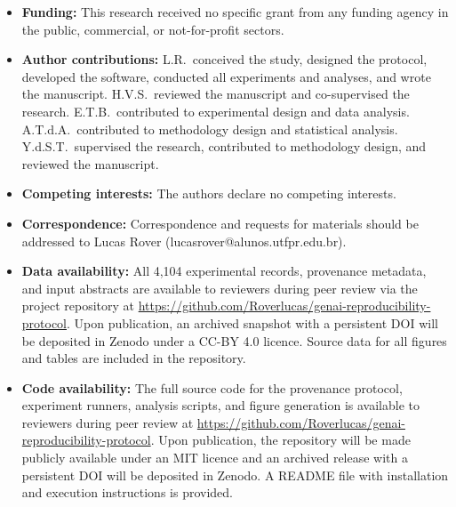 \documentclass[sn-nature]{sn-jnl}
\begin{document}
\begin{itemize}
\item \textbf{Funding:}
This research received no specific grant from any funding agency in the public, commercial, or not-for-profit sectors.

\item \textbf{Author contributions:}
L.R.\ conceived the study, designed the protocol, developed the software, conducted all experiments and analyses, and wrote the manuscript.
H.V.S.\ reviewed the manuscript and co-supervised the research.
E.T.B.\ contributed to experimental design and data analysis.
A.T.d.A.\ contributed to methodology design and statistical analysis.
Y.d.S.T.\ supervised the research, contributed to methodology design, and reviewed the manuscript.

\item \textbf{Competing interests:}
The authors declare no competing interests.

\item \textbf{Correspondence:}
Correspondence and requests for materials should be addressed to Lucas Rover (lucasrover@alunos.utfpr.edu.br).

\item \textbf{Data availability:}
All 4,104 experimental records, provenance metadata, and input abstracts are available to reviewers during peer review via the project repository at \url{https://github.com/Roverlucas/genai-reproducibility-protocol}. Upon publication, an archived snapshot with a persistent DOI will be deposited in Zenodo under a CC-BY 4.0 licence. Source data for all figures and tables are included in the repository.

\item \textbf{Code availability:}
The full source code for the provenance protocol, experiment runners, analysis scripts, and figure generation is available to reviewers during peer review at \url{https://github.com/Roverlucas/genai-reproducibility-protocol}. Upon publication, the repository will be made publicly available under an MIT licence and an archived release with a persistent DOI will be deposited in Zenodo. A README file with installation and execution instructions is provided.
\end{itemize}


\end{document}
